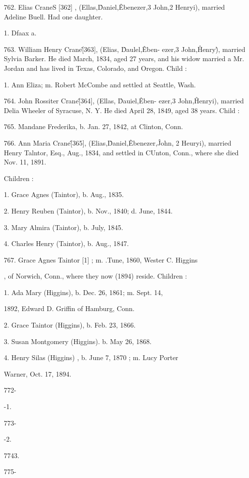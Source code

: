 762. Elias CraneS [362] , (Ellas,\^ Daniel,\^ Ebenezer,3 John,2 
Henryi), married Adeline Buell. Had one daughter. 

1. Dfaax a. 

763. William Henry Crane\^ [363], (Elias, \^ Daulel,\^ Eben- 
ezer,3 John,\^ Henry\^), married Sylvia Barker. He died March, 
1834, aged 27 years, and his widow married a Mr. Jordan and 
has lived in Texas, Colorado, and Oregon. Child : 

1. Ann Eliza; m. Robert McCombe and settled at Seattle, Wash. 

764. John Rossiter Crane\^ [364], (Ellas, \^ Dauiel,\^ Eben- 
ezer,3 John,\^ Henryi), married Delia Wheeler of Syracuse, N. Y. 
He died April 28, 1849, aged 38 years. Child : 

765. Mandane Frederika, b. Jan. 27, 1842, at Clinton, Conn. 

766. Ann Maria Crane\^ [365], (Elias,\^ Daniel,\^ Ebenezer,\^ 
John, 2 Heuryi), married Henry Talntor, Esq., Aug., 1834, and 
settled in CUnton, Conn., where she died Nov. 11, 1891. 

Children : 

1. Grace Agnes (Taintor), b. Aug., 1835. 

2. Henry Reuben (Taintor), b. Nov., 1840; d. June, 1844. 

3. Mary Almira (Taintor), b. July, 1845. 

4. Charles Henry (Taintor), b. Aug., 1847. 

767. Grace Agnes Taintor [1] ; m. .Tune, 1860, Wester C. Higgins 

, of Norwich, Conn., where they now (1894) reside. Children : 

1. Ada Mary (Higgins), b. Dec. 26, 1861; m. Sept. 14, 

1892, Edward D. Griffin of Hamburg, Conn. 

2. Grace Taintor (Higgins), b. Feb. 23, 1866. 

3. Susan Montgomery (Higgins). b. May 26, 1868. 

4. Henry Silas (Higgins) , b. June 7, 1870 ; m. Lucy Porter 

Warner, Oct. 17, 1894. 



772- 


-1. 


773- 


-2. 


7743. 


775- 


